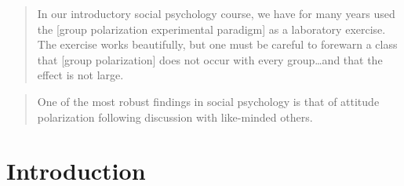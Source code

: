\documentclass[11pt, letterpaper]{article}
\begin{document}
\begin{quote}
In our introductory social psychology course, 
we have for many years used the [group polarization experimental paradigm] as
a laboratory exercise. The exercise works beautifully, but one must be
careful to forewarn a class that [group polarization] does not occur with every 
group\ldots and that the effect is not large. 
\par\raggedleft\cite[p. 205]{Brown1986}
\end{quote}

\begin{quote}
One of the most robust findings in social psychology is that of attitude polarization 
following discussion with like-minded others.
\par\raggedleft\cite[p. 267]{Cooper2001}
\end{quote}

\section{Introduction}
\end{document}
